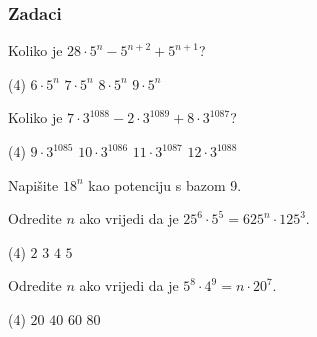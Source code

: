 \newpage

\subsubsection{Zadaci}

\setcounter{zadatak}{0}

\begin{zadatak}
	Koliko je $28 \cdot 5^n - 5^{n+2} + 5^{n+1}$?
    \begin{tasks}(4)
		\task $6 \cdot 5^n$
		\task $7 \cdot 5^n$
		\task $8 \cdot 5^n$
		\task $9 \cdot 5^n$
	\end{tasks}
\end{zadatak}

\begin{zadatak}
	Koliko je $7 \cdot 3^{1088} - 2 \cdot 3^{1089} + 8 \cdot 3^{1087}$?
    \begin{tasks}(4)
		\task $9 \cdot 3^{1085}$
		\task $10 \cdot 3^{1086}$
		\task $11 \cdot 3^{1087}$
		\task $12 \cdot 3^{1088}$
	\end{tasks}
\end{zadatak}

\begin{zadatak}
	Napišite $18^n$ kao potenciju s bazom 9.
\end{zadatak}

\begin{zadatak}
	Odredite $n$ ako vrijedi da je $25^6 \cdot 5^5 = 625^n \cdot 125^3$.
	\begin{tasks}(4)
		\task $2$
		\task $3$
		\task $4$
		\task $5$
	\end{tasks}
\end{zadatak}

\begin{zadatak}
	Odredite $n$ ako vrijedi da je $5^8 \cdot 4^9 = n \cdot 20^7$.
	\begin{tasks}(4)
		\task $20$
		\task $40$
		\task $60$
		\task $80$
	\end{tasks}
\end{zadatak}

\newpage